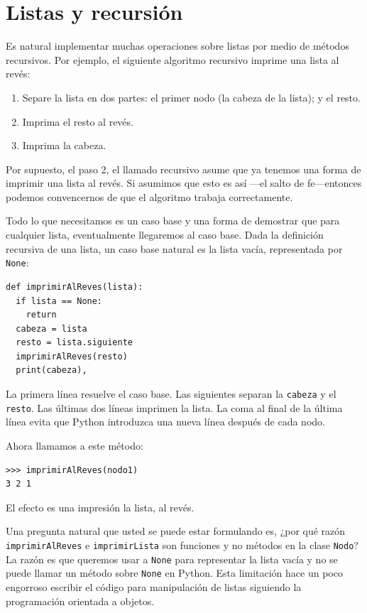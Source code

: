 \section{Listas y recursión}

\label{listrecursion}  

Es natural implementar muchas operaciones sobre listas por medio de
métodos recursivos. Por ejemplo, el siguiente algoritmo recursivo
imprime una lista al revés:
\begin{enumerate}
\item Separe la lista en dos partes: el primer nodo (la cabeza de la lista);
y el resto.
\item Imprima el resto al revés.
\item Imprima la cabeza.
\end{enumerate}
Por supuesto, el paso 2, el llamado recursivo asume que ya tenemos
una forma de imprimir una lista al revés. Si asumimos que esto es
así —el salto de fe—entonces podemos convencernos de que el algoritmo
trabaja correctamente.

 

Todo lo que necesitamos es un caso base y una forma de demostrar que
para cualquier lista, eventualmente llegaremos al caso base. Dada
la definición recursiva de una lista, un caso base natural es la lista
vacía, representada por \texttt{None}:

\beforeverb 
\begin{verbatim}
def imprimirAlReves(lista):
  if lista == None: 
    return
  cabeza = lista
  resto = lista.siguiente
  imprimirAlReves(resto)
  print(cabeza),
\end{verbatim}
\afterverb La primera línea resuelve el caso base. Las siguientes
separan la \texttt{cabeza} y el \texttt{resto}. Las últimas dos líneas
imprimen la lista. La coma al final de la última línea evita que Python
introduzca una nueva línea después de cada nodo.

Ahora llamamos a este método:

\beforeverb 
\begin{verbatim}
>>> imprimirAlReves(nodo1)
3 2 1
\end{verbatim}
\afterverb El efecto es una impresión la lista, al revés.

Una pregunta natural que usted se puede estar formulando es, ¿por
qué razón \texttt{imprimirAlReves} e \texttt{imprimirLista} son funciones
y no métodos en la clase \texttt{Nodo}? La razón es que queremos usar
a \texttt{None} para representar la lista vacía y no se puede llamar
un método sobre \texttt{None} en Python. Esta limitación hace un poco
engorroso escribir el código para manipulación de listas siguiendo
la programación orientada a objetos.

